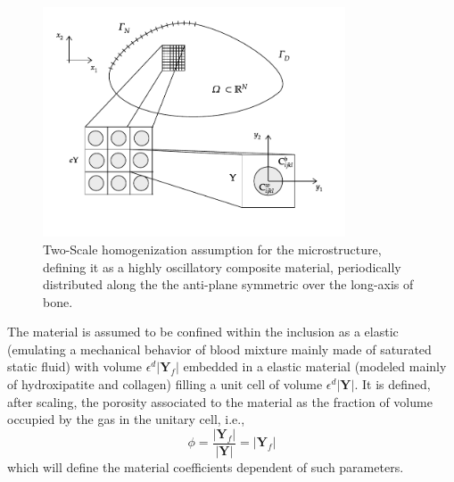 \begin{figure}[!h]
	\centering
	\includegraphics[width=0.8\textwidth]{images/HomSchemes/HomBasicScheme.pdf}
	\caption{Two-Scale homogenization assumption for the microstructure, defining it as a highly oscillatory composite material, periodically distributed along the the anti-plane symmetric over the long-axis of bone.}
	\label{HomBasicScheme}
\end{figure}

\begin{rem}
The material is assumed to be confined within the inclusion as a elastic (emulating a mechanical behavior of blood mixture mainly made of saturated static fluid) with volume $\epsilon^d \vert \mathbf{Y}_f \vert$ embedded in a elastic material (modeled mainly of hydroxipatite and collagen) filling a unit cell of volume $\epsilon^d \vert \mathbf{Y} \vert$.
It is defined, after scaling, the porosity associated to the material as the fraction of volume occupied by the gas in the unitary cell, i.e., 
\begin{equation*}
\phi = \frac{\vert \mathbf{Y}_f \vert}{\vert \mathbf{Y} \vert} = \vert \mathbf{Y}_f \vert
\end{equation*}
which will define the material coefficients dependent of such parameters.
\end{rem}

